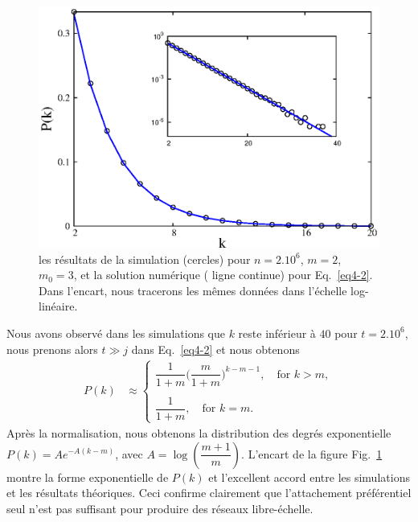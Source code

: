\begin{figure}[h]
	\centering
	\includegraphics{./figures/fig1}
	\caption{les résultats de la simulation (cercles)  pour $n=2.10^6$, $m=2$, $m_0=3$, et la solution numérique (	ligne continue) pour Eq.~\eqref{eq4-2}. Dans l'encart, nous tracerons les mêmes données dans l'échelle log-linéaire.}
	\label{fig1-2}
 \end{figure} 
Nous avons observé dans les simulations que $k$ reste inférieur à $40$ pour $t=2.10^6$, nous prenons alors $t\gg j $ dans Eq.~\ref{eq4-2} et nous obtenons
\begin{align}
P(k)&\approx 
\begin{cases}
\dfrac{1}{1+m}\Big(\dfrac{m}{1+m}\Big)^{k-m-1}, \quad \textrm{for }  k>m,\\
\\
\dfrac{1}{1+m}, \quad\textrm{for }  k=m.
\end{cases}
\label{eq5-2}
\end{align}
Après la normalisation, nous obtenons la distribution des degrés exponentielle $P(k)=Ae^{-A(k-m)}$, avec $A=\log(\dfrac{m+1}{m})$.
L'encart de la figure Fig.~\ref{fig1-2} montre la forme exponentielle de $ P(k)$ et l'excellent accord entre les simulations et les résultats théoriques.
Ceci confirme clairement que l'attachement préférentiel seul n'est pas suffisant pour produire des réseaux libre-échelle.

